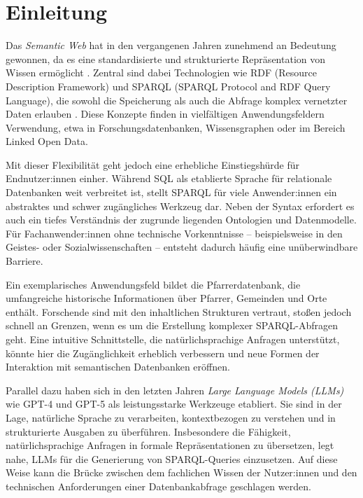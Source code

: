 
\chapter{Einleitung}
\label{sec:EinleitungUndIntension}

Das \emph{Semantic Web} hat in den vergangenen Jahren zunehmend an Bedeutung gewonnen, da es eine standardisierte und strukturierte Repräsentation von Wissen ermöglicht \cite{hitzler2008semantic}. Zentral sind dabei Technologien wie RDF (Resource Description Framework) und SPARQL (SPARQL Protocol and RDF Query Language), die sowohl die Speicherung als auch die Abfrage komplex vernetzter Daten erlauben \cite{w3c_sparql}. Diese Konzepte finden in vielfältigen Anwendungsfeldern Verwendung, etwa in Forschungsdatenbanken, Wissensgraphen oder im Bereich Linked Open Data.

Mit dieser Flexibilität geht jedoch eine erhebliche Einstiegshürde für Endnutzer:innen einher. Während SQL als etablierte Sprache für relationale Datenbanken weit verbreitet ist, stellt SPARQL für viele Anwender:innen ein abstraktes und schwer zugängliches Werkzeug dar. Neben der Syntax erfordert es auch ein tiefes Verständnis der zugrunde liegenden Ontologien und Datenmodelle. Für Fachanwender:innen ohne technische Vorkenntnisse – beispielsweise in den Geistes- oder Sozialwissenschaften – entsteht dadurch häufig eine unüberwindbare Barriere.

Ein exemplarisches Anwendungsfeld bildet die Pfarrerdatenbank, die umfangreiche historische Informationen über Pfarrer, Gemeinden und Orte enthält. Forschende sind mit den inhaltlichen Strukturen vertraut, stoßen jedoch schnell an Grenzen, wenn es um die Erstellung komplexer SPARQL-Abfragen geht. Eine intuitive Schnittstelle, die natürlichsprachige Anfragen unterstützt, könnte hier die Zugänglichkeit erheblich verbessern und neue Formen der Interaktion mit semantischen Datenbanken eröffnen.

Parallel dazu haben sich in den letzten Jahren \emph{Large Language Models (LLMs)} wie GPT-4 \cite{brown2020language} und GPT-5 \cite{openai2023gpt4} als leistungsstarke Werkzeuge etabliert. Sie sind in der Lage, natürliche Sprache zu verarbeiten, kontextbezogen zu verstehen und in strukturierte Ausgaben zu überführen. Insbesondere die Fähigkeit, natürlichsprachige Anfragen in formale Repräsentationen zu übersetzen, legt nahe, LLMs für die Generierung von SPARQL-Queries einzusetzen. Auf diese Weise kann die Brücke zwischen dem fachlichen Wissen der Nutzer:innen und den technischen Anforderungen einer Datenbankabfrage geschlagen werden.

